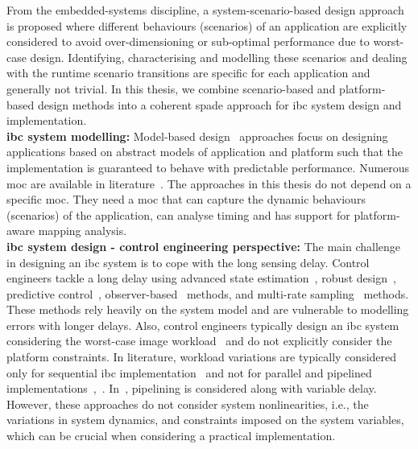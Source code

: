From the embedded-systems discipline, a system-scenario-based design approach~\cite{gheorghita2009system} is proposed where different behaviours (scenarios) of an application are explicitly considered to avoid over-dimensioning or sub-optimal performance due to worst-case design. 
Identifying, characterising and modelling these scenarios and dealing with the runtime scenario transitions are specific for each application and generally not trivial.
In this thesis, we combine scenario-based and platform-based design methods into a coherent \gls{spade} approach for \gls{ibc} system design and implementation.
\\[1ex]
\noindent\textbf{\gls{ibc} system modelling:} Model-based design~\cite{lee1998framework,thiele2000real} approaches focus on designing applications based on abstract models of application and platform such that the implementation is guaranteed to behave with predictable performance. 
Numerous \gls{moc} are available in literature~\cite{theelen2006scenario,stuijk2010predictable, ChakrabortyKT03, DavisBBL07}. 
The approaches in this thesis do not depend on a specific \gls{moc}.
They need a \gls{moc} that can capture the dynamic behaviours (scenarios) of the application, can analyse timing and has support for platform-aware mapping analysis. 
\\[1ex]
\noindent\textbf{\gls{ibc} system design - control engineering perspective:}
The main challenge in designing an \gls{ibc} system is to cope with the long sensing delay.
Control engineers tackle a long delay using advanced state estimation~\cite{wang2014multirate}, robust design~\cite{kawamura2012robust}, predictive control~\cite{macesanu2014time}, observer-based~\cite{van2018data} methods, and multi-rate
sampling~\cite{fujimoto2003visual} methods. 
These methods rely heavily on the system model and are vulnerable to modelling errors with longer delays.
Also, control engineers typically design an \gls{ibc} system considering the worst-case image workload~\cite{saidi2018future} and do not explicitly consider the platform constraints.
In literature, workload variations are typically considered only for sequential \gls{ibc} implementation~\cite{fontantelli2013optimal} and not for parallel and pipelined implementations~\cite{medina2019designing},~\cite{krautgartner1998performance}. 
In~\cite{medina2019implementation}, pipelining is considered along with variable delay.
However, these approaches do not consider system nonlinearities, i.e., the variations in system dynamics, and constraints imposed on the system variables, which can be crucial when considering a practical implementation.  

